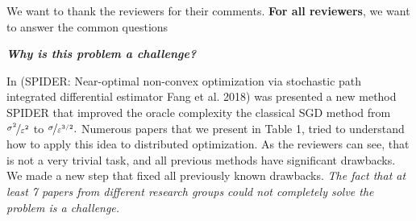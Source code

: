 \documentclass{article}
\begin{document}






We want to thank the reviewers for their comments. \textbf{For all reviewers}, we want to answer the common questions

\textbf{\textit{Why is this problem a challenge?}}

In (SPIDER: Near-optimal non-convex optimization via stochastic path integrated differential estimator 
Fang et al. 2018) was presented a new method SPIDER that improved the oracle complexity the classical SGD method from $\nicefrac{\sigma^2}{\varepsilon^2}$ to $\nicefrac{\sigma}{\varepsilon^{3/2}}.$ Numerous papers that we present in Table 1, tried to understand how to apply this idea to distributed optimization. As the reviewers can see, that is not a very trivial task, and all previous methods have significant drawbacks. We made a new step that fixed all previously known drawbacks. \emph{The fact that at least 7 papers from different research groups could not completely solve the problem is a challenge.}
\end{document}
